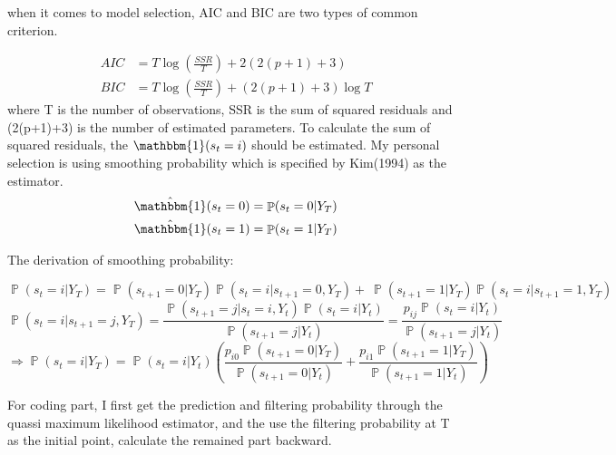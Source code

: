 \documentclass{article}
\DeclareMathOperator{\Prob}{\mathbb{P}}
\begin{document}
when it comes to model selection, AIC and BIC are two types of common criterion.

\begin{align}
    AIC &= T\log(\frac{SSR}{T}) + 2(2(p+1)+3) \\
    BIC &= T\log(\frac{SSR}{T}) + (2(p+1)+3)\log T
\end{align}
where T is the number of observations, SSR is the sum of squared residuals and 
(2(p+1)+3) is the number of estimated parameters. To calculate the sum of squared
residuals, the $\mathbbm{1}(s_t = i)$ should be estimated. My personal selection
is using smoothing probability which is specified by Kim(1994) as the 
estimator. 
\begin{align}
  \hat{\mathbbm{1}}(s_t = 0) &= \Prob(s_t = 0 | Y_T) \\
  \hat{\mathbbm{1}}(s_t = 1) &= \Prob(s_t = 1 | Y_T)
\end{align}

\newpage

The derivation of smoothing probability:

$$
\Prob(s_t = i | Y_T) = \Prob(s_{t+1} = 0 | Y_T) \Prob(s_t = i | s_{t+1} = 0, Y_T) +
\                      \Prob(s_{t+1} = 1 | Y_T) \Prob(s_t = i | s_{t+1} = 1, Y_T)
$$
$$
\Prob(s_t = i | s_{t+1} = j, Y_T) 
    = \frac{\Prob(s_{t+1} = j | s_t = i, Y_t)\Prob(s_t = i | Y_t)}
    {\Prob(s_{t+1} = j | Y_t)}
    = \frac{p_{ij}\Prob(s_t = i | Y_t)}{\Prob(s_{t+1} = j | Y_t)}
$$
$$
\Rightarrow \Prob(s_t = i | Y_T) = \Prob(s_t = i | Y_t)(\frac{p_{i0}\Prob(s_{t+1} = 0 | Y_T)}{\Prob(s_{t+1} = 0 | Y_t)} + 
    \frac{p_{i1}\Prob(s_{t+1} = 1 | Y_T)}{\Prob(s_{t+1} = 1 | Y_t)} )
$$

For coding part, I first get the prediction and filtering probability through the 
quassi maximum likelihood estimator, and the use the filtering probability at T as
the initial point, calculate the remained part backward.

\newpage
\end{document}
